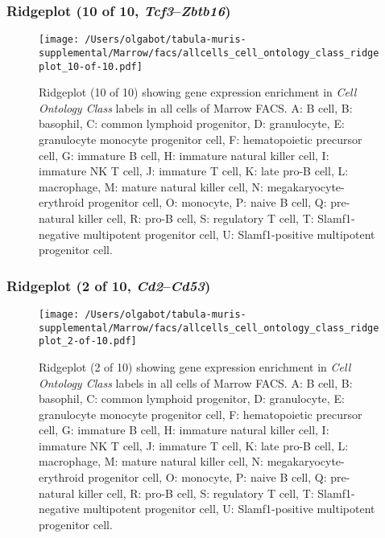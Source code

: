 \clearpage

\subsubsection{Ridgeplot (10 of 10, \emph{Tcf3}--\emph{Zbtb16})}
\begin{figure}[h]
\centering
\texttt{[image: /Users/olgabot/tabula-muris-supplemental/Marrow/facs/allcells\_cell\_ontology\_class\_ridgeplot\_10-of-10.pdf]}

\caption{ Ridgeplot (10 of 10)  showing gene expression enrichment in \emph{Cell Ontology Class} labels in all cells of Marrow FACS. A: B cell, B: basophil, C: common lymphoid progenitor, D: granulocyte, E: granulocyte monocyte progenitor cell, F: hematopoietic precursor cell, G: immature B cell, H: immature natural killer cell, I: immature NK T cell, J: immature T cell, K: late pro-B cell, L: macrophage, M: mature natural killer cell, N: megakaryocyte-erythroid progenitor cell, O: monocyte, P: naive B cell, Q: pre-natural killer cell, R: pro-B cell, S: regulatory T cell, T: Slamf1-negative multipotent progenitor cell, U: Slamf1-positive multipotent progenitor cell.}
\end{figure}


\clearpage

\subsubsection{Ridgeplot (2 of 10, \emph{Cd2}--\emph{Cd53})}
\begin{figure}[h]
\centering
\texttt{[image: /Users/olgabot/tabula-muris-supplemental/Marrow/facs/allcells\_cell\_ontology\_class\_ridgeplot\_2-of-10.pdf]}

\caption{ Ridgeplot (2 of 10)  showing gene expression enrichment in \emph{Cell Ontology Class} labels in all cells of Marrow FACS. A: B cell, B: basophil, C: common lymphoid progenitor, D: granulocyte, E: granulocyte monocyte progenitor cell, F: hematopoietic precursor cell, G: immature B cell, H: immature natural killer cell, I: immature NK T cell, J: immature T cell, K: late pro-B cell, L: macrophage, M: mature natural killer cell, N: megakaryocyte-erythroid progenitor cell, O: monocyte, P: naive B cell, Q: pre-natural killer cell, R: pro-B cell, S: regulatory T cell, T: Slamf1-negative multipotent progenitor cell, U: Slamf1-positive multipotent progenitor cell.}
\end{figure}


\clearpage

